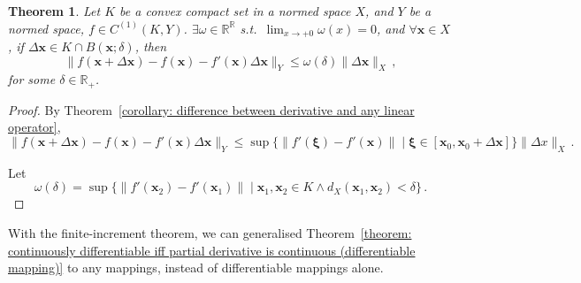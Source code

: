 \documentclass[openany]{book}
\theoremstyle{plain}
\newtheorem{theorem}{Theorem}[section] %
\theoremstyle{definition}
\newcommand*{\bv}{\boldsymbol} %
\begin{document}
\begin{theorem}
	Let $K$ be a convex compact set in a normed space $X$, and $Y$ be a normed space, $f \in C^{(1)}(K, Y)$. 
	$\exists \omega \in \mathbb R^\mathbb R$ s.t.\ $\lim_{x \to + 0} \omega(x) = 0$, and $\forall \bv x \in X$, if $\Delta \bv x \in K \cap B(\bv x; \delta)$, then
	\begin{equation*}
		\|f(\bv x + \Delta \bv x) - f(\bv x) - f'(\bv x) \Delta \bv x\|_Y
			\leq \omega(\delta) \|\Delta \bv x\|_X\,,
	\end{equation*}
	for some $\delta \in \mathbb R_+$.
\end{theorem}
\begin{proof}
	By Theorem~\ref{corollary: difference between derivative and any linear operator}, 
	\begin{equation*}
		\|f(\bv x + \Delta \bv x) - f(\bv x) - f'(\bv x) \Delta \bv x\|_Y
			\leq \sup \big\{\|f'(\bv \xi) - f'(\bv x)\|  
				\mid \bv \xi \in [\bv x_0, \bv x_0 + \Delta \bv x]\big\}
				\|\Delta x\|_X\,.
	\end{equation*}

	Let
	\begin{equation*}
		\omega(\delta) 
		= \sup\big\{\|f'(\bv x_2) - f'(\bv x_1)\| \mid \bv x_1, \bv x_2 \in K 
			\wedge d_X(\bv x_1, \bv x_2) < \delta\big\}\,.
	\end{equation*}
\end{proof}

With the finite-increment theorem, we can generalised Theorem~\ref{theorem: continuously differentiable iff partial derivative is continuous (differentiable mapping)} to any mappings, instead of differentiable mappings alone.
\end{document}
